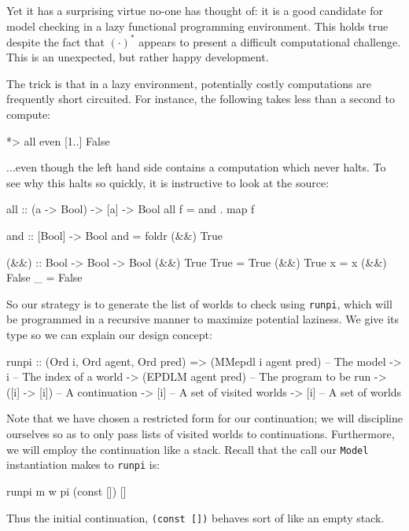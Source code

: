 \documentclass[11pt]{article}
\theoremstyle{definition}
\begin{document}
Yet it has a surprising virtue no-one has thought of: it is a good candidate for model checking in a lazy functional programming environment. This holds true despite the fact that $(\cdot)^\ast$ appears to present a difficult computational challenge.  This is an unexpected, but rather happy development.

The trick is that in a lazy environment, potentially costly computations are frequently short circuited.  For instance, the following takes less than a second to compute:

\begin{mycode}
*> all even [1..]
False
\end{mycode}

$\ldots$even though the left hand side contains a computation which never halts.  To see why this halts so quickly, it is instructive to look at the source:
\begin{mycode}
all :: (a -> Bool) -> [a] -> Bool
all f = and . map f

and :: [Bool] -> Bool
and = foldr (&&) True

(&&) :: Bool -> Bool -> Bool
(&&) True True = True
(&&) True x = x
(&&) False _ = False
\end{mycode}

So our strategy is to generate the list of worlds to check using \texttt{runpi}, which will be programmed in a recursive manner to maximize potential laziness.  We give its type so we can explain our design concept:
\begin{code}
runpi :: (Ord i, Ord agent, Ord pred) => 
            (MMepdl i agent pred)           -- The model
         -> i                               -- The index of a world
         -> (EPDLM agent pred)              -- The program to be run
         -> ([i] -> [i])                    -- A continuation
         -> [i]                             -- A set of visited worlds
         -> [i]                             -- A set of worlds
\end{code}

Note that we have chosen a restricted form for our continuation; we will discipline ourselves so as to only pass lists of visited worlds to continuations.  Furthermore, we will employ the continuation like a stack.  Recall that the call our \texttt{Model} instantiation makes to \texttt{runpi} is:
\begin{mycode}
runpi m w pi (const []) []
\end{mycode}

Thus the initial continuation, \texttt{(const [])} behaves sort of like an empty stack.
\end{document}
